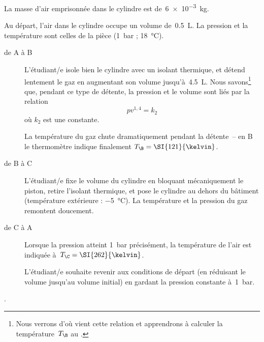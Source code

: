 	La masse d’air emprisonnée dans le cylindre est de~\SI{6e-3}{\kilogram}.
	
	Au départ, l’air dans le cylindre occupe un volume de~\SI{0,5}{\liter}. La pression et la température sont celles de la pièce (\SI{1}{bar} ; \SI{18}{\degreeCelsius}).

	\begin{description}
		\item[de A à B] L’étudiant/e isole bien le cylindre avec un isolant thermique, et détend lentement le gaz en augmentant son volume jusqu’à~\SI{4,5}{\liter}. Nous savons\footnote{Nous verrons d’où vient cette relation et apprendrons à calculer la température~$T_\B$ au \coursquatre.} que, pendant ce type de détente, la pression et le volume sont liés par la relation
			\begin{equation*}
				p v^{1,4} = k_2
			\end{equation*}
			 où $k_2$ est une constante.
		
			La température du gaz chute dramatiquement pendant la détente\ – en B le thermomètre indique finalement $T_\B = \SI{121}{\kelvin}$.
		
		\item[de B à C]	L’étudiant/e fixe le volume du cylindre en bloquant mécaniquement le piston, retire l’isolant thermique, et pose le cylindre au dehors du bâtiment (température extérieure : \SI{-5}{\degreeCelsius}). La température et la pression du gaz remontent doucement.

		\item[de C à A] Lorsque la pression atteint \SI{1}{\bar} précisément, la température de l’air est indiquée à~$T_\C = \SI{262}{\kelvin}$. 	
					
			L’étudiant/e souhaite revenir aux conditions de départ (en réduisant le volume jusqu’au volume initial) en gardant la pression constante à~\SI{1}{\bar}.
	\end{description}.
	

